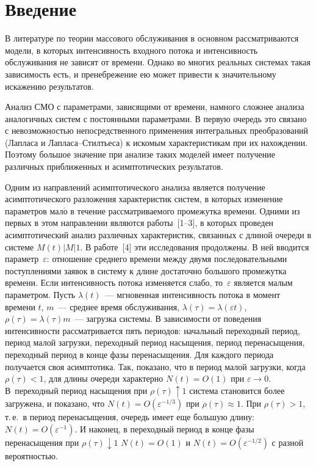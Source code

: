      \begin{multicols}{2}

      \label{st\stat}

\section {Введение}

В литературе по теории массового обслуживания в основном рассматриваются модели, в
которых интенсивность входного потока и
интенсивность обслуживания  не зависят от времени. Однако во многих реальных системах такая
зависимость есть,  и пренебрежение ею может привести к значительному искажению результатов.

Анализ СМО с параметрами, зависящими от времени, намного сложнее анализа аналогичных систем
с постоянными параметрами. В первую оче\-редь это связано с невозможностью непосредст\-вен\-но\-го применения интегральных
преобразований (Лапласа и Лапласа--Стил\-тье\-са) к искомым характеристикам при их нахождении. Поэтому большое значение
при анализе таких моделей имеет получение различных приближенных и асимптотических результатов.

Одним из направлений асимптотического анализа является 
получение асимптотического разложения характеристик систем, в которых из\-менение
параметров мал$\acute{\mbox{о}}$ в течение рассматриваемого промежутка времени. Одними из первых в этом направлении являются работы~[1--3],
в которых проведен асимптотический анализ различных ха\-рактеристик, связанных с длиной очереди в сис\-те\-ме $M(t)\vert M\vert 1.$ 
В работе~[4] эти
исследования продолжены. В ней вводится параметр~$\varepsilon$: отношение среднего времени между двумя последовательными
поступлениями заявок в систему к длине достаточно большого промежутка времени. Если интенсивность потока изменяется слабо, 
то~$\varepsilon$ является малым параметром. Пусть $\lambda(t)$~--- мгновенная интенсивность потока в момент времени $t$, $m$~--- среднее время
обслуживания, $\lambda(\tau)=\lambda(\varepsilon t)$, $\rho(\tau)=\lambda(\tau) m$~--- загрузка системы.
В зависимости от поведения интенсивности рассматривается пять
периодов: начальный переходный период, период малой загрузки,
переходный период насыщения, период перенасыщения, переходный период
в конце фазы перенасыщения. Для каждого периода получается своя
асимптотика. Так, показано, что в период малой загрузки, когда
$\rho(\tau) < 1$, для длины очереди характерно $N(t) = O(1)$   при
$\varepsilon \rightarrow 0$. В~переходный период насыщения при
$\rho(\tau)\uparrow 1$ сис\-те\-ма становится более загружена, и
показано, что $N(t) = O(\varepsilon^{-1/3})$ при $\rho(\tau)\approx 1$. При $\rho(\tau) > 1$, т.\,е.\ в период
перенасыщения, очередь имеет еще большую длину: $N(t) =
O(\varepsilon^{-1})$. И наконец, в переходный период в конце фазы
перенасыщения при  $\rho(\tau) \downarrow 1$ $N(t) = O(1)$ и $N(t)=
O(\varepsilon^{-1/2})$ с разной ве\-ро\-ят\-ностью.


\end{multicols}
